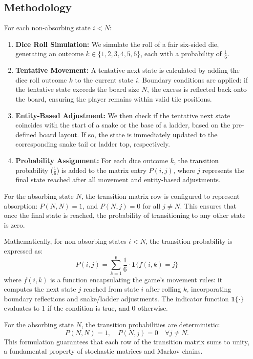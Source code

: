\subsection{Methodology}
For each non-absorbing state $i < N$:
\begin{enumerate}
	\item \textbf{Dice Roll Simulation:} We simulate the roll of a fair six-sided die, generating an outcome $k \in \{1, 2, 3, 4, 5, 6\}$, each with a probability of $\frac{1}{6}$.
	\item \textbf{Tentative Movement:} A tentative next state is calculated by adding the dice roll outcome $k$ to the current state $i$. Boundary conditions are applied: if the tentative state exceeds the board size $N$, the excess is reflected back onto the board, ensuring the player remains within valid tile positions.
	\item \textbf{Entity-Based Adjustment:} We then check if the tentative next state coincides with the start of a snake or the base of a ladder, based on the pre-defined board layout. If so, the state is immediately updated to the corresponding snake tail or ladder top, respectively.
	\item \textbf{Probability Assignment:} For each dice outcome $k$, the transition probability ($\frac{1}{6}$) is added to the matrix entry $P(i, j)$, where $j$ represents the final state reached after all movement and entity-based adjustments.
\end{enumerate}

For the absorbing state $N$, the transition matrix row is configured to represent absorption: $P(N, N) = 1$, and $P(N, j) = 0$ for all $j \neq N$. This ensures that once the final state is reached, the probability of transitioning to any other state is zero.

Mathematically, for non-absorbing states $i < N$, the transition probability is expressed as:
\[
P(i, j) = \sum_{k=1}^{6} \frac{1}{6} \cdot \mathbf{1}\{f(i,k) = j \}
\]
where $f(i,k)$ is a function encapsulating the game's movement rules: it computes the next state $j$ reached from state $i$ after rolling $k$, incorporating boundary reflections and snake/ladder adjustments. The indicator function $\mathbf{1}\{\cdot\}$ evaluates to 1 if the condition is true, and 0 otherwise.

For the absorbing state $N$, the transition probabilities are deterministic:
\[
P(N, N) = 1, \quad P(N, j) = 0 \quad \forall j \neq N.
\]
This formulation guarantees that each row of the transition matrix sums to unity, a fundamental property of stochastic matrices and Markov chains.

